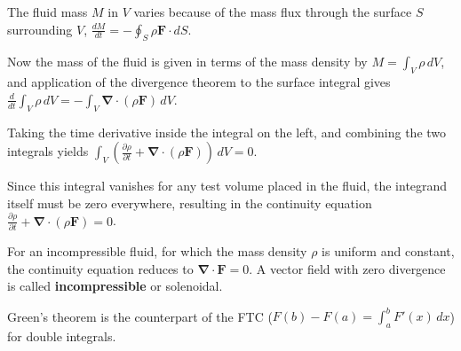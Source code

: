 \begin{paracol}{2}
The fluid mass $M$ in $V$ varies because of the mass flux through the surface $S$ surrounding $V$, $\frac{dM}{dt} = - \oint_S \rho \mathbf{F} \cdot dS$.

Now the mass of the fluid is given in terms of the mass density by $M = \int_V \rho \, dV$, and application of the divergence theorem to the surface integral gives $\frac{d}{dt} \int_V \rho \, dV = - \int_V \mathbf{\nabla} \cdot (\rho \mathbf{F}) \, dV$.

Taking the time derivative inside the integral on the left, and combining the two integrals yields $\int_V ( \frac{\partial \rho}{\partial t} + \mathbf{\nabla} \cdot (\rho \mathbf{F}) ) \, dV = 0$.

Since this integral vanishes for any test volume placed in the fluid, the integrand itself must be zero everywhere, resulting in the continuity equation $\frac{\partial \rho}{\partial t} + \mathbf{\nabla} \cdot (\rho \mathbf{F}) = 0$.

For an incompressible fluid, for which the mass density $\rho$ is uniform and constant, the continuity equation reduces to $\mathbf{\nabla} \cdot \mathbf{F} = 0$. A vector field with zero divergence is called \textbf{incompressible} or solenoidal.


Green's theorem is the counterpart of the FTC ($F(b) - F(a) = \int_a^b F'(x) \, dx$) for double integrals.

\end{paracol}
